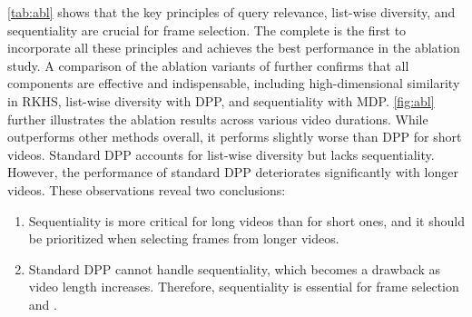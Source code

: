\cref{tab:abl} shows that the key principles of query relevance, list-wise diversity, and sequentiality are crucial for frame selection.
The complete \mname{} is the first to incorporate all these principles and achieves the best performance in the ablation study.
%
A comparison of the ablation variants of \mname{} further confirms that 
all components are effective and indispensable, including high-dimensional similarity in RKHS, list-wise diversity with DPP, and sequentiality with MDP.
%
\cref{fig:abl} further illustrates the ablation results across various video durations. 
While \mname{} outperforms other methods overall, it performs slightly worse than DPP for short videos.
Standard DPP accounts for list-wise diversity but lacks sequentiality.
However, the performance of standard DPP deteriorates significantly with longer videos.
%
These observations reveal two conclusions:
\begin{enumerate}
    \item Sequentiality is more critical for long videos than for short ones, and it should be prioritized when selecting frames from longer videos.
    \item Standard DPP cannot handle sequentiality, which becomes a drawback as video length increases.  Therefore, sequentiality is essential for frame selection and \mname{}.
\end{enumerate}
















